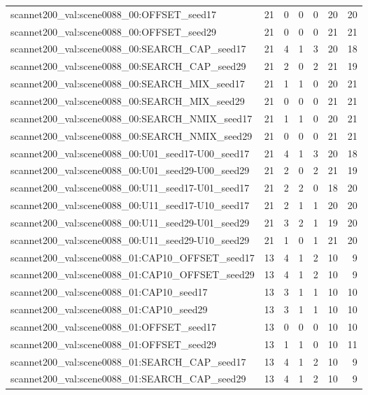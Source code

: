 \begin{table}[t]
\begin{tabular}{lrrrrrr}
scannet200\_val:scene0088\_00:OFFSET\_seed17 & 21 & 0 & 0 & 0 & 20 & 20 \\
scannet200\_val:scene0088\_00:OFFSET\_seed29 & 21 & 0 & 0 & 0 & 21 & 21 \\
scannet200\_val:scene0088\_00:SEARCH\_CAP\_seed17 & 21 & 4 & 1 & 3 & 20 & 18 \\
scannet200\_val:scene0088\_00:SEARCH\_CAP\_seed29 & 21 & 2 & 0 & 2 & 21 & 19 \\
scannet200\_val:scene0088\_00:SEARCH\_MIX\_seed17 & 21 & 1 & 1 & 0 & 20 & 21 \\
scannet200\_val:scene0088\_00:SEARCH\_MIX\_seed29 & 21 & 0 & 0 & 0 & 21 & 21 \\
scannet200\_val:scene0088\_00:SEARCH\_NMIX\_seed17 & 21 & 1 & 1 & 0 & 20 & 21 \\
scannet200\_val:scene0088\_00:SEARCH\_NMIX\_seed29 & 21 & 0 & 0 & 0 & 21 & 21 \\
scannet200\_val:scene0088\_00:U01\_seed17-U00\_seed17 & 21 & 4 & 1 & 3 & 20 & 18 \\
scannet200\_val:scene0088\_00:U01\_seed29-U00\_seed29 & 21 & 2 & 0 & 2 & 21 & 19 \\
scannet200\_val:scene0088\_00:U11\_seed17-U01\_seed17 & 21 & 2 & 2 & 0 & 18 & 20 \\
scannet200\_val:scene0088\_00:U11\_seed17-U10\_seed17 & 21 & 2 & 1 & 1 & 20 & 20 \\
scannet200\_val:scene0088\_00:U11\_seed29-U01\_seed29 & 21 & 3 & 2 & 1 & 19 & 20 \\
scannet200\_val:scene0088\_00:U11\_seed29-U10\_seed29 & 21 & 1 & 0 & 1 & 21 & 20 \\
scannet200\_val:scene0088\_01:CAP10\_OFFSET\_seed17 & 13 & 4 & 1 & 2 & 10 & 9 \\
scannet200\_val:scene0088\_01:CAP10\_OFFSET\_seed29 & 13 & 4 & 1 & 2 & 10 & 9 \\
scannet200\_val:scene0088\_01:CAP10\_seed17 & 13 & 3 & 1 & 1 & 10 & 10 \\
scannet200\_val:scene0088\_01:CAP10\_seed29 & 13 & 3 & 1 & 1 & 10 & 10 \\
scannet200\_val:scene0088\_01:OFFSET\_seed17 & 13 & 0 & 0 & 0 & 10 & 10 \\
scannet200\_val:scene0088\_01:OFFSET\_seed29 & 13 & 1 & 1 & 0 & 10 & 11 \\
scannet200\_val:scene0088\_01:SEARCH\_CAP\_seed17 & 13 & 4 & 1 & 2 & 10 & 9 \\
scannet200\_val:scene0088\_01:SEARCH\_CAP\_seed29 & 13 & 4 & 1 & 2 & 10 & 9 \\

\end{tabular}
\end{table}
